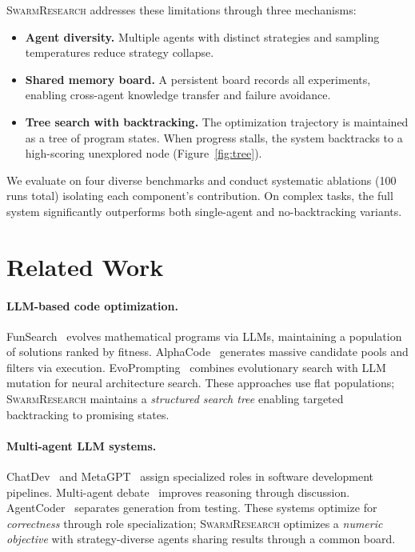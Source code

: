 \documentclass{article}
\begin{document}
\textsc{SwarmResearch} addresses these limitations through three mechanisms:
\begin{itemize}[nosep,leftmargin=1.2em]
\item \textbf{Agent diversity.} Multiple agents with distinct strategies and sampling temperatures reduce strategy collapse.
\item \textbf{Shared memory board.} A persistent board records all experiments, enabling cross-agent knowledge transfer and failure avoidance.
\item \textbf{Tree search with backtracking.} The optimization trajectory is maintained as a tree of program states. When progress stalls, the system backtracks to a high-scoring unexplored node (Figure~\ref{fig:tree}).
\end{itemize}

We evaluate on four diverse benchmarks and conduct systematic ablations (100 runs total) isolating each component's contribution. On complex tasks, the full system significantly outperforms both single-agent and no-backtracking variants.

\section{Related Work}
\label{sec:related}

\paragraph{LLM-based code optimization.}
FunSearch~\cite{romera2024funsearch} evolves mathematical programs via LLMs, maintaining a population of solutions ranked by fitness.
AlphaCode~\cite{li2023alphacode2} generates massive candidate pools and filters via execution.
EvoPrompting~\cite{chen2023evoprompting} combines evolutionary search with LLM mutation for neural architecture search.
These approaches use flat populations; \textsc{SwarmResearch} maintains a \emph{structured search tree} enabling targeted backtracking to promising states.

\paragraph{Multi-agent LLM systems.}
ChatDev~\cite{qian2024chatdev} and MetaGPT~\cite{hong2024metagpt} assign specialized roles in software development pipelines.
Multi-agent debate~\cite{du2023improving} improves reasoning through discussion.
AgentCoder~\cite{huang2024agentcoder} separates generation from testing.
These systems optimize for \emph{correctness} through role specialization; \textsc{SwarmResearch} optimizes a \emph{numeric objective} with strategy-diverse agents sharing results through a common board.
\end{document}

